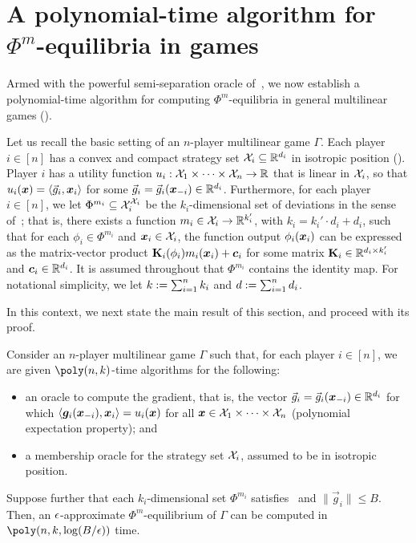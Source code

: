 \section{A polynomial-time algorithm for $\Phi^m$-equilibria in games}

Armed with the powerful semi-separation oracle of~, we now establish a polynomial-time algorithm for computing $\Phi^m$-equilibria in general multilinear games ().

Let us recall the basic setting of an $n$-player multilinear game $\Gamma$. Each player $i \in [n]$ has a convex and compact strategy set ${\mathcal{X}}_i \subseteq \mathbb R^{d_i}$ in isotropic position (). Player $i$ has a utility function $u_i : {\mathcal{X}}_1 \times \dots \times {\mathcal{X}}_n \to \mathbb R$ that is linear in ${\mathcal{X}}_i$, so that $u_i({\bm{x}}) = \langle \vec{g}_i, {\bm{x}}_i \rangle$ for some $\vec{g}_i = \vec{g}_i({\bm{x}}_{-i}) \in \mathbb R^{d_i}$. %
Furthermore, for each player $i \in [n]$, we let $\Phi^{m_i} \subseteq {\mathcal{X}}_i^{{\mathcal{X}}_i}$ be the $k_i$-dimensional set of deviations in the sense of~; that is, there exists a function $m_i \in {\mathcal{X}}_i \to \mathbb R^{k_i'}$, with $k_i = k_i' \cdot d_i + d_i$, such that for each $\phi_i \in \Phi^{m_i}$ and ${\bm{x}}_i \in {\mathcal{X}}_i$, the function output $\phi_i({\bm{x}}_i)$ can be expressed as the matrix-vector product ${\mathbf{K}}_i(\phi_i) m_i({\bm{x}}_i) + \bm{c}_i$ for some matrix ${\mathbf{K}}_i \in \mathbb R^{d_i \times k_i'}$ and $\bm{c}_i \in \mathbb R^{d_i}$. It is assumed throughout that $\Phi^{m_i}$ contains the identity map. For notational simplicity, we let $k := \sum_{i=1}^n k_i$ and $d := \sum_{i=1}^n d_i$.

In this context, we next state the main result of this section, and proceed with its proof.

\begin{theorem}
    \label{theorem:main-eah-prec}
    Consider an $n$-player multilinear game $\Gamma$ such that, for each player $i \in [n]$, we are given $\poly(n, k)$-time algorithms for the following:
\begin{itemize}
\item an oracle to compute the gradient, that is, the vector $\vec{g}_i = \vec{g}_i({\bm{x}}_{-i}) \in \mathbb R^{d_i}$ for which $\ip{\vg_i(\vx_{-i}), \vx_i} = u_i(\vx)$ for all ${\bm{x}} \in {\mathcal{X}}_1 \times \dots \times {\mathcal{X}}_n$ (polynomial expectation property); and
\item a membership oracle for the strategy set ${\mathcal{X}}_i$, assumed to be in isotropic position.
\end{itemize}
Suppose further that each $k_i$-dimensional set $\Phi^{m_i}$ satisfies~ and $\|\vec{g}_i \| \leq B$. Then, an $\epsilon$-approximate $\Phi^m$-equilibrium of $\Gamma$ can be computed in $\poly\qty(n, k, \log(B/\eps))$ time.
\end{theorem}

